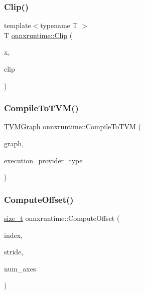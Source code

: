 \mbox{\label{namespaceonnxruntime_ac0eef4e07b6c093b76a27c9c0042125c}} 
\subsubsection{\texorpdfstring{Clip()}{Clip()}}
{\footnotesize\ttfamily template$<$typename T $>$ \\
T \mbox{\hyperlink{classonnxruntime_1_1Clip}{onnxruntime\+::\+Clip}} (\begin{DoxyParamCaption}\item[{const T \&}]{x,  }\item[{T}]{clip }\end{DoxyParamCaption})}

\mbox{\label{namespaceonnxruntime_a4b3dbf1759aa7c7299c88497c70c633a}} 
\subsubsection{\texorpdfstring{Compile\+To\+T\+V\+M()}{CompileToTVM()}}
{\footnotesize\ttfamily \mbox{\hyperlink{structonnxruntime_1_1TVMGraph}{T\+V\+M\+Graph}} onnxruntime\+::\+Compile\+To\+T\+VM (\begin{DoxyParamCaption}\item[{const \mbox{\hyperlink{classonnxruntime_1_1Graph}{onnxruntime\+::\+Graph}} \&}]{graph,  }\item[{\mbox{\hyperlink{namespaceonnxruntime_a863e2227cbf32aab76aad35fdadff4bb}{onnxruntime\+::\+Provider\+Type}}}]{execution\+\_\+provider\+\_\+type }\end{DoxyParamCaption})}

\mbox{\label{namespaceonnxruntime_a7a2e4f2598c13e495cadce91ef4bea4f}} 
\subsubsection{\texorpdfstring{Compute\+Offset()}{ComputeOffset()}}
{\footnotesize\ttfamily \mbox{\hyperlink{mlasi_8h_a503efbc1c6e50825320ad909366b78ab}{size\+\_\+t}} onnxruntime\+::\+Compute\+Offset (\begin{DoxyParamCaption}\item[{const std\+::vector$<$ int64\+\_\+t $>$ \&}]{index,  }\item[{const std\+::vector$<$ \mbox{\hyperlink{mlasi_8h_a503efbc1c6e50825320ad909366b78ab}{size\+\_\+t}} $>$ \&}]{stride,  }\item[{int64\+\_\+t}]{num\+\_\+axes }\end{DoxyParamCaption})}

